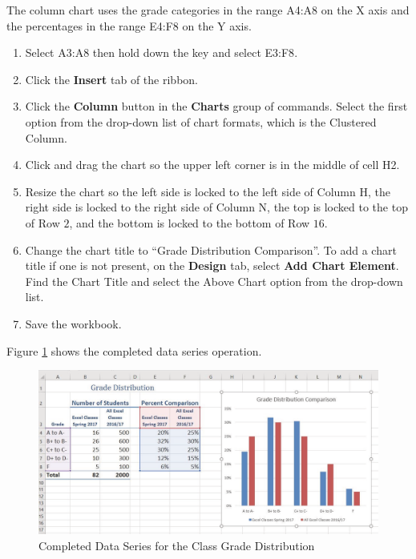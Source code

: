 The column chart uses the grade categories in the range \textsf{A4:A8} on the X axis and the percentages in the range \textsf{E4:F8} on the Y axis. 

\begin{enumerate}
	\item Select \textsf{A3:A8} then hold down the  key and select \textsf{E3:F8}.
	\item Click the \textbf{Insert} tab of the ribbon.
	\item Click the \textbf{Column} button in the \textbf{Charts} group of commands. Select the first option from the drop-down list of chart formats, which is the Clustered Column.
	\item Click and drag the chart so the upper left corner is in the middle of cell \textsf{H2}.
	\item Resize the chart so the left side is locked to the left side of Column H, the right side is locked to the right side of Column N, the top is locked to the top of Row $ 2 $, and the bottom is locked to the bottom of Row $ 16 $.
	\item Change the chart title to ``Grade Distribution Comparison''. To add a chart title if one is not present, on the \textbf{Design} tab, select \textbf{Add Chart Element}. Find the Chart Title and select the Above Chart option from the drop-down list.
	\item Save the workbook.
\end{enumerate}

Figure \ref{04:fig17} shows the completed data series operation.

\begin{figure}[H]
	\centering
	\includegraphics[width=\maxwidth{.95\linewidth}]{gfx/ch04_fig17}
	\caption{Completed Data Series for the Class Grade Distribution}
	\label{04:fig17}
\end{figure}

